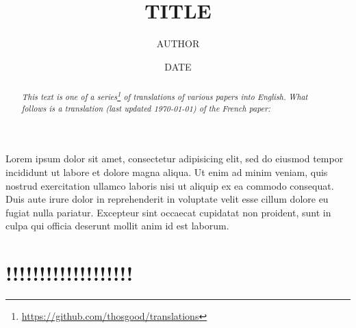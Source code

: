 \documentclass{article}
\theoremstyle{plain}
\theoremstyle{definition}
\begin{document}
\renewcommand{\abstractname}{Translator's note.}

\title{TITLE}
\author{AUTHOR}
\date{DATE}
\maketitle

\begin{abstract}
  \renewcommand*{\thefootnote}{\fnsymbol{footnote}}
  \emph{This text is one of a series\footnote{\url{https://github.com/thosgood/translations}} of translations of various papers into English.}
  \emph{What follows is a translation (last updated \today) of the French paper:}

  \medskip\noindent
\end{abstract}

\tableofcontents



\bigskip\bigskip
Lorem ipsum dolor sit amet, consectetur adipisicing elit, sed do eiusmod
tempor incididunt ut labore et dolore magna aliqua. Ut enim ad minim veniam,
quis nostrud exercitation ullamco laboris nisi ut aliquip ex ea commodo
consequat. Duis aute irure dolor in reprehenderit in voluptate velit esse
cillum dolore eu fugiat nulla pariatur. Excepteur sint occaecat cupidatat non
proident, sunt in culpa qui officia deserunt mollit anim id est laborum.


\section{!!!!!!!!!!!!!!!!!!!}
\label{section1}




\nocite{*}


\end{document}
